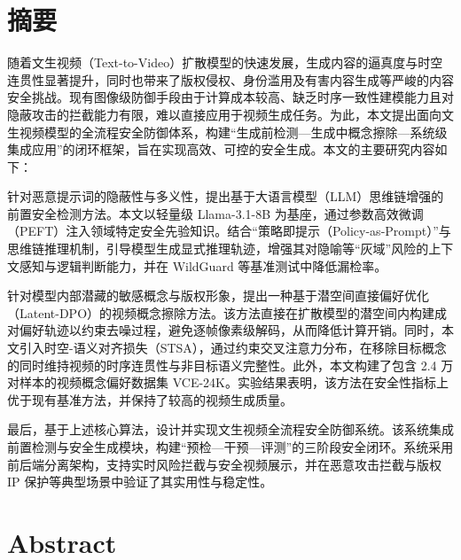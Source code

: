 
\maketitle%
\MAKETITLE%
\makedeclaration%
\intobmk\chapter*{摘\quad 要}%
\setcounter{page}{1}%

随着文生视频（Text-to-Video）扩散模型的快速发展，生成内容的逼真度与时空连贯性显著提升，同时也带来了版权侵权、身份滥用及有害内容生成等严峻的内容安全挑战。现有图像级防御手段由于计算成本较高、缺乏时序一致性建模能力且对隐蔽攻击的拦截能力有限，难以直接应用于视频生成任务。为此，本文提出面向文生视频模型的全流程安全防御体系，构建“生成前检测—生成中概念擦除—系统级集成应用”的闭环框架，旨在实现高效、可控的安全生成。本文的主要研究内容如下：

针对恶意提示词的隐蔽性与多义性，提出基于大语言模型（LLM）思维链增强的前置安全检测方法。本文以轻量级 Llama-3.1-8B 为基座，通过参数高效微调（PEFT）注入领域特定安全先验知识。结合“策略即提示（Policy-as-Prompt）”与思维链推理机制，引导模型生成显式推理轨迹，增强其对隐喻等“灰域”风险的上下文感知与逻辑判断能力，并在 WildGuard 等基准测试中降低漏检率。

针对模型内部潜藏的敏感概念与版权形象，提出一种基于潜空间直接偏好优化（Latent-DPO）的视频概念擦除方法。该方法直接在扩散模型的潜空间内构建成对偏好轨迹以约束去噪过程，避免逐帧像素级解码，从而降低计算开销。同时，本文引入时空-语义对齐损失（STSA），通过约束交叉注意力分布，在移除目标概念的同时维持视频的时序连贯性与非目标语义完整性。此外，本文构建了包含 2.4 万对样本的视频概念偏好数据集 VCE-24K。实验结果表明，该方法在安全性指标上优于现有基准方法，并保持了较高的视频生成质量。

最后，基于上述核心算法，设计并实现文生视频全流程安全防御系统。该系统集成前置检测与安全生成模块，构建“预检—干预—评测”的三阶段安全闭环。系统采用前后端分离架构，支持实时风险拦截与安全视频展示，并在恶意攻击拦截与版权 IP 保护等典型场景中验证了其实用性与稳定性。

\intobmk\chapter*{Abstract}%

